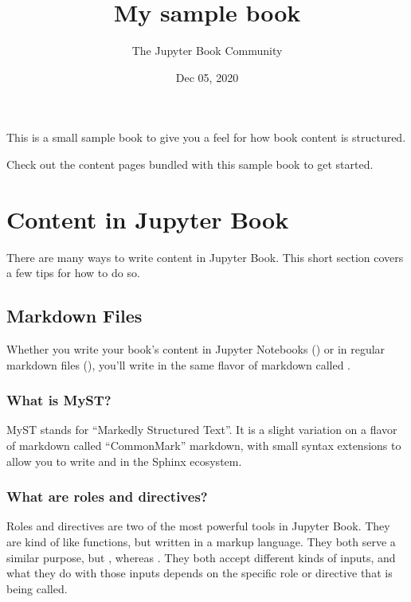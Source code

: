 \documentclass[letterpaper,10pt,english]{sphinxmanual}
\title{My sample book}
\date{Dec 05, 2020}
\author{The Jupyter Book Community}
\begin{document}
\pagestyle{empty}
\sphinxmaketitle
\pagestyle{plain}
\sphinxtableofcontents
\pagestyle{normal}
\label{\detokenize{intro::doc}}


This is a small sample book to give you a feel for how book content is
structured.

Check out the content pages bundled with this sample book to get started.


\chapter{Content in Jupyter Book}
\label{\detokenize{content:content-in-jupyter-book}}\label{\detokenize{content::doc}}
There are many ways to write content in Jupyter Book. This short section
covers a few tips for how to do so.


\section{Markdown Files}
\label{\detokenize{markdown:markdown-files}}\label{\detokenize{markdown::doc}}
Whether you write your book’s content in Jupyter Notebooks () or
in regular markdown files (), you’ll write in the same flavor of markdown
called .


\subsection{What is MyST?}
\label{\detokenize{markdown:what-is-myst}}
MyST stands for “Markedly Structured Text”. It
is a slight variation on a flavor of markdown called “CommonMark” markdown,
with small syntax extensions to allow you to write  and 
in the Sphinx ecosystem.


\subsection{What are roles and directives?}
\label{\detokenize{markdown:what-are-roles-and-directives}}
Roles and directives are two of the most powerful tools in Jupyter Book. They
are kind of like functions, but written in a markup language. They both
serve a similar purpose, but , whereas
. They both accept different kinds of inputs,
and what they do with those inputs depends on the specific role or directive
that is being called.
\end{document}
